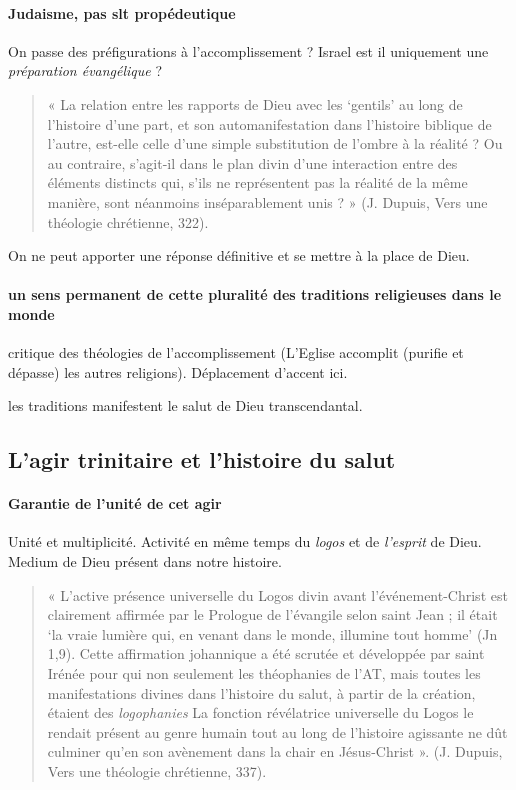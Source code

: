 \paragraph{Judaisme, pas slt propédeutique} On passe des préfigurations à l'accomplissement ? Israel est il uniquement une \textit{préparation évangélique} ? 
 \begin{quote}
     « La relation entre les rapports de Dieu avec les ‘gentils’ au long de l’histoire d’une part, et son
automanifestation dans l’histoire biblique de l’autre, est-elle celle d’une simple substitution de l’ombre
à la réalité ? Ou au contraire, s’agit-il dans le plan divin d’une interaction entre des éléments distincts
qui, s’ils ne représentent pas la réalité de la même manière, sont néanmoins inséparablement unis ? »
(J. Dupuis, Vers une théologie chrétienne, 322).
 \end{quote}
On ne peut apporter une réponse définitive et se mettre à la place de Dieu.

\paragraph{un sens permanent de cette pluralité des traditions religieuses dans le monde} critique des théologies de l'accomplissement (L'Eglise accomplit (purifie et dépasse) les autres religions). Déplacement d'accent ici. 

\begin{Synthesis}
les traditions manifestent le salut de Dieu transcendantal. 
\end{Synthesis}


\subsection{L’agir trinitaire et l’histoire du salut}

\paragraph{Garantie de l'unité de cet agir} Unité et multiplicité. Activité en même temps du \textit{logos} et de \textit{l'esprit} de Dieu. Medium de Dieu présent dans notre histoire. 


\begin{quote}
    « L’active présence universelle du Logos divin avant l’événement-Christ est clairement affirmée par le
Prologue de l’évangile selon saint Jean ; il était ‘la vraie lumière qui, en venant dans le monde,
illumine tout homme’ (Jn 1,9). Cette affirmation johannique a été scrutée et développée par saint
Irénée pour qui non seulement les théophanies de l’AT, mais toutes les manifestations divines dans
l’histoire du salut, à partir de la création, étaient des \textit{logophanies} La fonction révélatrice universelle du
Logos le rendait présent au genre humain tout au long de l’histoire agissante ne dût culminer qu’en
son avènement dans la chair en Jésus-Christ ». (J. Dupuis, Vers une théologie chrétienne, 337).
\end{quote}


